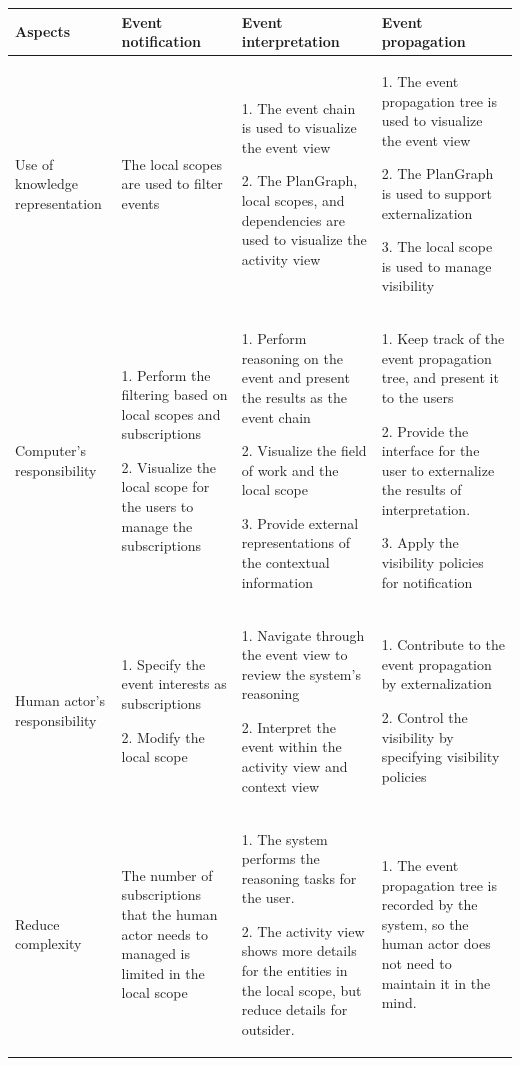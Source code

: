 \begin{table}[htbp]
\centering
\footnotesize
\begin{tabular}{>{\raggedright}p{0.8in}>{\raggedright}p{1.5in}>{\raggedright}p{1.5in}>{\raggedright}p{1.7in}}

\toprule 
\textbf{Aspects} & \textbf{Event notification} & \textbf{Event interpretation} & \textbf{Event propagation}\tabularnewline
\midrule 
Use of knowledge representation & The local scopes are used to filter events  & 1. The event chain is used to visualize the event view

2. The PlanGraph, local scopes, and dependencies are used to visualize
the activity view & 1. The event propagation tree is used to visualize the event view

2. The PlanGraph is used to support externalization

3. The local scope is used to manage visibility\tabularnewline
\midrule 
Computer's responsibility & 1. Perform the filtering based on local scopes and subscriptions

2. Visualize the local scope for the users to manage the subscriptions & 1. Perform reasoning on the event and present the results as the event
chain

2. Visualize the field of work and the local scope

3. Provide external representations of the contextual information & 1. Keep track of the event propagation tree, and present it to the
users

2. Provide the interface for the user to externalize the results of
interpretation.

3. Apply the visibility policies for notification\tabularnewline
\midrule 
Human actor's responsibility & 1. Specify the event interests as subscriptions 

2. Modify the local scope & 1. Navigate through the event view to review the system's reasoning

2. Interpret the event within the activity view and context view & 1. Contribute to the event propagation by externalization

2. Control the visibility by specifying visibility policies\tabularnewline
\midrule 
Reduce complexity & The number of subscriptions that the human actor needs to managed
is limited in the local scope & 1. The system performs the reasoning tasks for the user.

2. The activity view shows more details for the entities in the local
scope, but reduce details for outsider. & 1. The event propagation tree is recorded by the system,
so the human actor does not need to maintain it in the mind.


\end{tabular}
\end{table}
